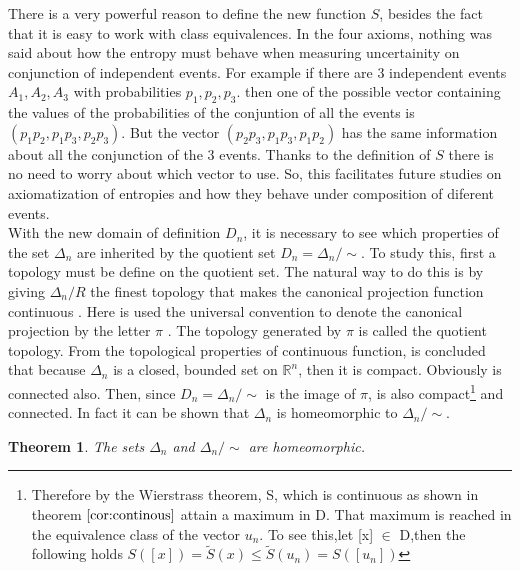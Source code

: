 \documentclass[11pt]{article}
\theoremstyle{plain}
\newtheorem{theorem}{Theorem}[section]
\begin{document}
There is a very powerful reason to define the new function $S$,
besides the fact that it is easy to work with class equivalences.
In the four axioms, nothing was said about how the entropy must
behave when measuring uncertainity on conjunction of independent
events. For example if there are 3 independent events $A_{1},
A_{2}, A_{3}$ with probabilities $p_{1},p_{2}, p_{3}$. then one of
the possible vector containing the values of the probabilities of
the conjuntion of all the events is
$(p_{1}p_{2},p_{1}p_{3},p_{2}p_{3})$. But the vector
$(p_{2}p_{3},p_{1}p_{3},p_{1}p_{2})$ has the same information
about all the conjunction of the 3 events. Thanks to the
definition of $S$ there is no need to worry about which vector to
use. So, this facilitates future studies on axiomatization of
entropies and how they behave under composition of diferent
events.
\newline
\\
With the new domain of definition $D_{n}$, it is necessary to see
which properties of the set $\Delta_{n}$ are inherited by the
quotient set $D_{n}=\Delta_{n}/\sim$. To study this, first a topology must
be define
 on the quotient set. The natural way to do this is by
giving $\Delta_{n}/R$ the finest topology that makes the canonical
projection function continuous \cite{Rubiano, Janich}. Here is used
the universal convention to denote the canonical projection by the
letter $\pi$ . The  topology generated by $\pi$ is called the quotient topology. From
the topological properties of continuous function, is concluded
that because $\Delta_{n}$ is a closed, bounded set on
$\mathbb{R}^{n}$, then it is compact. Obviously is connected also. Then, since
$D_{n}=\Delta_{n}/\sim$ is the image of $\pi$, is also
compact\footnote{Therefore by the Wierstrass theorem, S, which is
continuous as shown in theorem $\ref{cor:continous}$ attain a
maximum in D. That maximum is reached in the equivalence class of
the vector $u_{n}$. To see this,let [x] $\in$ D,then the following
holds $S([x])=\tilde{S}(x)\leq \tilde{S}(u_{n})=S([u_{n}])$} and
connected. In fact it can be shown that $\Delta_{n}$ is
homeomorphic to $\Delta_{n}/\sim$.

\begin{theorem}
The sets $\Delta_{n}$ and $\Delta_{n}/\sim$ are homeomorphic.
\end{theorem}
\end{document}
